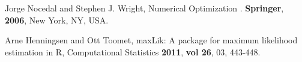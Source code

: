 \documentclass[journal,article,submit,moreauthors,pdftex]{Definitions/mdpi}
\begin{document}


%

\begin{thebibliography}{999}
Jorge Nocedal and Stephen J. Wright, Numerical Optimization . {\bf Springer}, {\bf 2006}, New York, NY, USA.


Arne Henningsen and Ott Toomet, maxLik: A package for maximum likelihood estimation in {R}, Computational Statistics {\bf 2011}, {\bf vol 26}, 03, 443-448.

 

\end{thebibliography}





\end{document}
